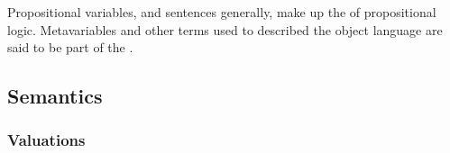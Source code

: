 \documentclass{article}
\begin{document}
Propositional variables, and sentences generally, make up the
 of propositional logic.  Metavariables and other
terms used to described the object language are said to be part of the
.

\subsection{Semantics}

\subsubsection{Valuations}
\end{document}
